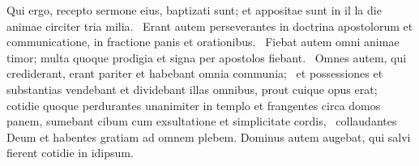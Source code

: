 \begin{biblechapter}
\verse Qui ergo, recepto sermone eius, baptizati sunt; et appositae sunt in il la die animae circiter tria milia.  
\verse Erant autem perseverantes in doctrina apostolorum et communicatione, in fractione panis et orationibus.  
\verse Fiebat autem omni animae timor; multa quoque prodigia et signa per apostolos fiebant.  
\verse Omnes autem, qui crediderant, erant pariter et habebant omnia communia;  
\verse et possessiones et substantias vendebant et dividebant illas omnibus, prout cuique opus erat;  
\verse cotidie quoque perdurantes unanimiter in templo et frangentes circa domos panem, sumebant cibum cum exsultatione et simplicitate cordis,  
\verse collaudantes Deum et habentes gratiam ad omnem plebem. Dominus autem augebat, qui salvi fierent cotidie in idipsum. 
\end{biblechapter}

